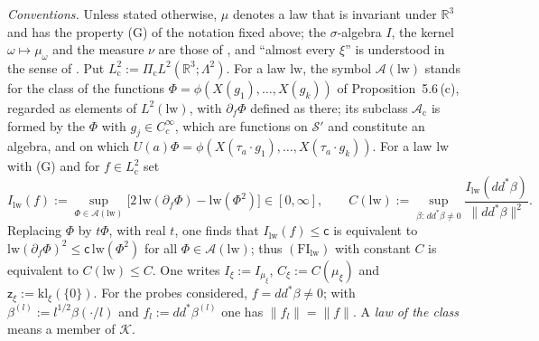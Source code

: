\documentclass[11pt,letterpaper,reqno]{amsart}
\theoremstyle{definition}
\begin{document}
\emph{Conventions.}
Unless stated otherwise, $\mu$ denotes a law that is invariant under $\mathbb R^3$ and has the property (G) of the notation fixed above;
the $\sigma$-algebra $I$, the kernel $\omega\mapsto\mu_\omega$ and the measure $\nu$ are those of \cite[Proposition~45.6]{QEDIII}, and ``almost every $\xi$'' is understood in the sense of \cite[(n7)]{QEDIII}.
Put $L^2_{\mathrm c}:=\Pi_{\mathrm c}L^2(\mathbb R^3;\Lambda^2)$.
For a law $\mathrm{lw}$, the symbol $\mathcal A(\mathrm{lw})$ stands for the class of the functions $\Phi=\phi(X(g_1),\dots,X(g_k))$ of Proposition~5.6\,(c), regarded as elements of $L^2(\mathrm{lw})$, with $\partial_f\Phi$ defined as there;
its subclass $\mathcal A_{\mathrm c}$ is formed by the $\Phi$ with $g_j\in C_c^\infty$, which are functions on $\mathcal S'$ and constitute an algebra, and on which $U(a)\Phi=\phi(X(\tau_a\cdot g_1),\dots,X(\tau_a\cdot g_k))$.
For a law $\mathrm{lw}$ with (G) and for $f\in L^2_{\mathrm c}$ set
\begin{equation*}
I_{\mathrm{lw}}(f):=\sup_{\Phi\in\mathcal A(\mathrm{lw})}\bigl[2\,\mathrm{lw}(\partial_f\Phi)-\mathrm{lw}(\Phi^2)\bigr]\in[0,\infty],\qquad C(\mathrm{lw}):=\sup_{\beta:\,dd^*\beta\ne0}\frac{I_{\mathrm{lw}}(dd^*\beta)}{\|dd^*\beta\|^2}.
\end{equation*}
Replacing $\Phi$ by $t\Phi$, with real $t$, one finds that $I_{\mathrm{lw}}(f)\le\mathsf c$ is equivalent to $\mathrm{lw}(\partial_f\Phi)^2\le\mathsf c\,\mathrm{lw}(\Phi^2)$ for all $\Phi\in\mathcal A(\mathrm{lw})$;
thus $(\mathrm{FI}_{\mathrm{lw}})$ with constant $C$ is equivalent to $C(\mathrm{lw})\le C$.
One writes $I_\xi:=I_{\mu_\xi}$, $C_\xi:=C(\mu_\xi)$ and $\mathsf z_\xi:=\mathrm{kl}_\xi(\{0\})$.
For the probes considered, $f=dd^*\beta\ne0$;
with $\beta^{(l)}:=l^{1/2}\beta(\cdot/l)$ and $f_l:=dd^*\beta^{(l)}$ one has $\|f_l\|=\|f\|$.
A \emph{law of the class} means a member of $\mathcal K$.
\end{document}
